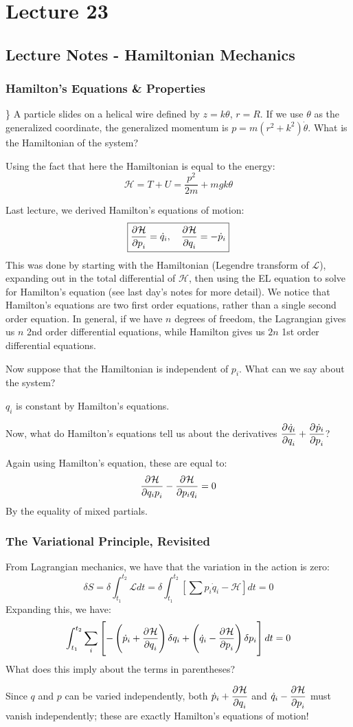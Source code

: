 \documentclass[../PHYS306Notes.tex]{subfiles}
\begin{document}
\section{Lecture 23}
\subsection{Lecture Notes - Hamiltonian Mechanics}
\subsubsection{Hamilton's Equations \& Properties} \}
A particle slides on a helical wire defined by $z = k\theta$, $r = R$. If we use $\theta$ as the generalized coordinate, the generalized momentum is $p = m(r^2 + k^2)\dot{\theta}$. What is the Hamiltonian of the system?
\begin{s}
    Using the fact that here the Hamiltonian is equal to the energy:
    \[\mathcal{H} = T + U = \frac{p^2}{2m} + mgk\theta\]
\end{s}
Last lecture, we derived Hamilton's equations of motion:
\[\boxed{\dpd{\mathcal{H}}{p_i} = \dot{q}_i, \quad \dpd{\mathcal{H}}{q_i} = - \dot{p}_i}\]
This was done by starting with the Hamiltonian (Legendre transform of $\mathcal{L}$), expanding out in the total differential of $\mathcal{H}$, then using the EL equation to solve for Hamilton's equation (see last day's notes for more detail). We notice that Hamilton's equations are two first order equations, rather than a single second order equation. In general, if we have $n$ degrees of freedom, the Lagrangian gives us $n$ 2nd order differential equations, while Hamilton gives us $2n$ 1st order differential equations. 

\noindent Now suppose that the Hamiltonian is independent of $p_i$. What can we say about the system?
\begin{s}
$q_i$ is constant by Hamilton's equations.
\end{s}

Now, what do Hamilton's equations tell us about the derivatives $\dpd{\dot{q}_i}{q_i} + \dpd{\dot{p}_i}{p_i}$?
\begin{s}
Again using Hamilton's equation, these are equal to:
\[\dpd{\HH}{q_ip_i} - \dpd{\HH}{p_iq_i} = 0\]
By the equality of mixed partials.
\end{s}

\subsubsection{The Variational Principle, Revisited}
From Lagrangian mechanics, we have that the variation in the action is zero:
\[\delta S = \delta \int_{t_1}^{t_2}\mathcal{L}dt = \delta \int_{t_1}^{t_2}[\sum p_i\dot{q}_i - \mathcal{H}]dt = 0\]
Expanding this, we have:
\[\int_{t_1}^{t_2}\sum_i \left[-\left(\dot{p}_i + \dpd{\HH}{q_i}\right)\delta q_i + \left(\dot{q}_i - \dpd{\HH}{p_i}\right)\delta p_i\right] dt = 0\]
What does this imply about the terms in parentheses?
\begin{s}
Since $q$ and $p$ can be varied independently, both $\dot{p}_i + \dpd{\HH}{q_i}$ and $\dot{q}_i - \dpd{\HH}{p_i}$ must vanish independently; these are exactly Hamilton's equations of motion!
\end{s}
\end{document}
